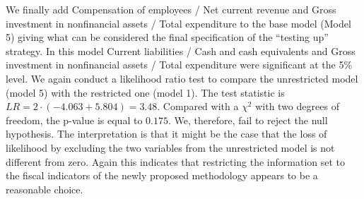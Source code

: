 We finally add Compensation of employees / Net current revenue and Gross investment in nonfinancial assets / Total expenditure to the base model (Model 5) giving what can be considered the final specification of the ``testing up'' strategy. In this model Current liabilities / Cash and cash equivalents and Gross investment in nonfinancial assets / Total expenditure were significant at the 5\% level. We again conduct a likelihood ratio test to compare the unrestricted model (model 5) with the restricted one (model 1). The test statistic is $LR = 2 \cdot (-4.063 + 5.804) = 3.48$. Compared with a $\chi^2$ with two degrees of freedom, the p-value is equal to $0.175$. We, therefore, fail to reject the null hypothesis. The interpretation is that it might be the case that the loss of likelihood by excluding the two variables from the unrestricted model is not different from zero. Again this indicates that restricting the information set to the fiscal indicators of the newly proposed methodology appears to be a reasonable choice.



\clearpage